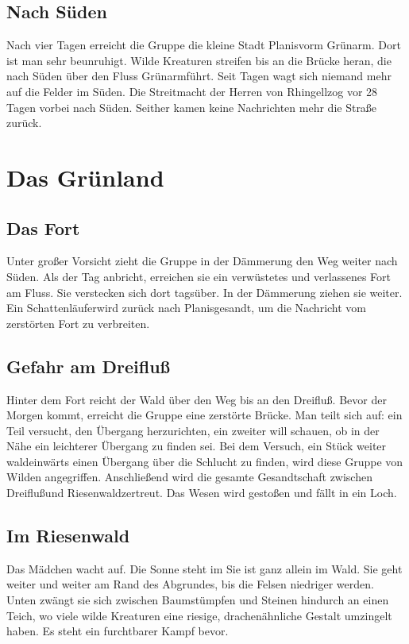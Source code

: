 \documentclass[12pt,a4paper,onecolumn,twoside,ngerman]{book}
\newcommand{\Schattenjager}{Schattenläufer}
\newcommand{\Rhingell}{Rhingell}
\newcommand{\Dreifluss}{Dreifluß}
\newcommand{\Planis}{Planis}
\newcommand{\Grunarm}{Grünarm}
\newcommand{\Grunland}{Grünland}
\newcommand{\Riesenwald}{Riesenwald}
\begin{document}
\section{Nach Süden}
Nach vier Tagen erreicht die Gruppe die kleine Stadt \Planis vorm \Grunarm. Dort ist man sehr beunruhigt. Wilde Kreaturen streifen bis an die Brücke heran, die nach Süden über den Fluss \Grunarm führt. Seit Tagen wagt sich niemand mehr auf die Felder im Süden. Die Streitmacht der Herren von \Rhingell zog vor 28 Tagen vorbei nach Süden. Seither kamen keine Nachrichten mehr die Straße zurück.
 
\chapter{Das \Grunland}
\section{Das Fort}
Unter großer Vorsicht zieht die Gruppe in der Dämmerung den Weg weiter nach Süden. Als der Tag anbricht, erreichen sie ein verwüstetes und verlassenes Fort am Fluss. Sie verstecken sich dort tagsüber. In der Dämmerung ziehen sie weiter. Ein \Schattenjager wird zurück nach \Planis gesandt, um die Nachricht vom zerstörten Fort zu verbreiten.

\section{Gefahr am \Dreifluss}
Hinter dem Fort reicht der Wald über den Weg bis an den \Dreifluss. Bevor der Morgen kommt, erreicht die Gruppe eine zerstörte Brücke. Man teilt sich auf: ein Teil versucht, den Übergang herzurichten, ein zweiter will schauen, ob in der Nähe ein leichterer Übergang zu finden sei. Bei dem Versuch, ein Stück weiter waldeinwärts einen Übergang über die Schlucht zu finden, wird diese Gruppe von Wilden angegriffen. Anschließend wird die gesamte Gesandtschaft zwischen \Dreifluss und \Riesenwald zertreut. Das Wesen wird gestoßen und fällt in ein Loch.

\section{Im \Riesenwald}
Das Mädchen wacht auf. Die Sonne steht im Sie ist ganz allein im Wald. Sie geht weiter und weiter am Rand des Abgrundes, bis die Felsen niedriger werden. Unten zwängt sie sich zwischen Baumstümpfen und Steinen hindurch an einen Teich, wo viele wilde Kreaturen eine riesige, drachenähnliche Gestalt umzingelt haben. Es steht ein furchtbarer Kampf bevor.
\end{document}
